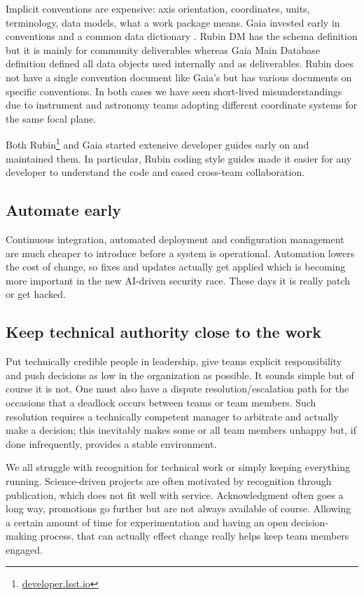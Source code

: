 Implicit conventions are expensive: axis orientation, coordinates, units, terminology, data models, what a work package means.
Gaia invested early in conventions \citep{LL:BAS-003} and a common data dictionary \citep{LL:JH-001}.
Rubin DM has the schema definition but it is mainly for community deliverables whereas Gaia Main Database definition
defined all data objects used internally and as deliverables.
Rubin does not have a single convention document like Gaia's but has various documents on specific conventions.
In both cases we have seen short-lived misunderstandings due to instrument and astronomy teams adopting different coordinate systems for the same focal plane.

Both Rubin\footnote{\url{developer.lsst.io}} and Gaia \citep{LL:WOM-011} started extensive developer guides early on and maintained them.
In particular, Rubin coding style guides made it easier for any developer to understand the code and eased cross-team collaboration.

\subsection{Automate early}

{\sloppy Continuous integration, automated deployment and configuration management are much cheaper to introduce before a system is operational.
Automation lowers the cost of change, so fixes and updates actually get applied which is becoming more important in the new AI-driven security race.
These days it is really patch or get hacked.\par}

\subsection{Keep technical authority close to the work}

Put technically credible people in leadership, give teams explicit responsibility and push decisions as low in the organization as possible.
It sounds simple but of course it is not.
One must also have a dispute resolution/escalation path for the occasions that a deadlock occurs between teams or team members.
Such resolution requires a technically competent manager to arbitrate and actually make a decision; this inevitably makes some or all team members unhappy but, if done infrequently, provides a stable environment.

We all struggle with recognition for technical work or simply keeping everything running.
Science-driven projects are often motivated by recognition through publication, which does not fit well with service.
Acknowledgment often goes a long way, promotions go further but are not always available of course.
Allowing a certain amount of time for experimentation and having an open decision-making process,
that can actually effect change
really helps keep team members engaged.

